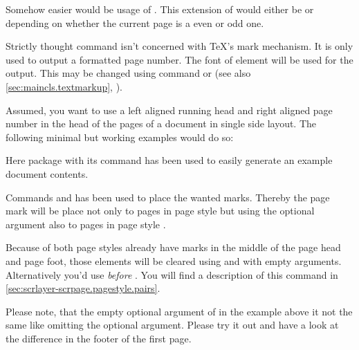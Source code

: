 Somehow easier would be usage of . This extension of
 would either be  or 
depending on whether the current page is a even or odd one.

Strictly thought command  isn't concerned with \TeX's mark
mechanism. It is only used to output a formatted page number.
%
The font of element
 will be used for
the output. This may be changed using command  or
 (see also \autoref{sec:maincls.textmarkup},
).%
%
%
\begin{Example}
  Assumed, you want to use a left aligned running head and right aligned page
  number in the head of the pages of a document in single side layout. The
  following minimal but working examples would do so:
  Here package  with its command
   has been used to easily
  generate an example document contents.

  Commands  and  has been used to place the wanted
  marks. Thereby the page mark will be place not only to pages in page style
   but using the optional argument also to pages in
  page style .

  Because of both page styles already have marks in the middle of the page
  head and page foot, those elements will be cleared using  and
   with empty arguments. Alternatively you'd use
   \emph{before} . You will find a
  description of this command in
  \autoref{sec:scrlayer-scrpage.pagestyle.pairs}.
\end{Example}

Please note, that the empty optional argument of
 in the example above it not the same like omitting the optional
argument. Please try it out and have a look at the difference in the footer of
the first page.%
%
%
%
%
%

